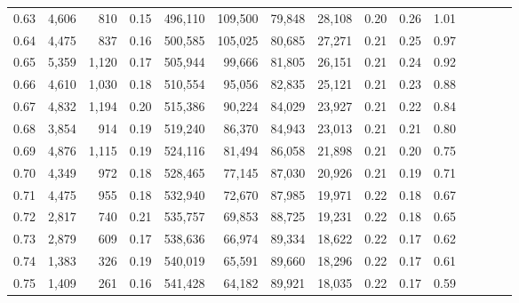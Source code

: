 \begin{tabular}{rrrcrrrrrrrrrrr}
0.63 &   4,606 &     810 &                                       0.15 &  496,110 &  109,500 &   79,848 &  28,108 &  0.20 &  0.26 &                         1.01 \\
0.64 &   4,475 &     837 &                                       0.16 &  500,585 &  105,025 &   80,685 &  27,271 &  0.21 &  0.25 &                         0.97 \\
0.65 &   5,359 &   1,120 &                                       0.17 &  505,944 &   99,666 &   81,805 &  26,151 &  0.21 &  0.24 &                         0.92 \\
0.66 &   4,610 &   1,030 &                                       0.18 &  510,554 &   95,056 &   82,835 &  25,121 &  0.21 &  0.23 &                         0.88 \\
0.67 &   4,832 &   1,194 &                                       0.20 &  515,386 &   90,224 &   84,029 &  23,927 &  0.21 &  0.22 &                         0.84 \\
0.68 &   3,854 &     914 &                                       0.19 &  519,240 &   86,370 &   84,943 &  23,013 &  0.21 &  0.21 &                         0.80 \\
0.69 &   4,876 &   1,115 &                                       0.19 &  524,116 &   81,494 &   86,058 &  21,898 &  0.21 &  0.20 &                         0.75 \\
0.70 &   4,349 &     972 &                                       0.18 &  528,465 &   77,145 &   87,030 &  20,926 &  0.21 &  0.19 &                         0.71 \\
0.71 &   4,475 &     955 &                                       0.18 &  532,940 &   72,670 &   87,985 &  19,971 &  0.22 &  0.18 &                         0.67 \\
0.72 &   2,817 &     740 &                                       0.21 &  535,757 &   69,853 &   88,725 &  19,231 &  0.22 &  0.18 &                         0.65 \\
0.73 &   2,879 &     609 &                                       0.17 &  538,636 &   66,974 &   89,334 &  18,622 &  0.22 &  0.17 &                         0.62 \\
0.74 &   1,383 &     326 &                                       0.19 &  540,019 &   65,591 &   89,660 &  18,296 &  0.22 &  0.17 &                         0.61 \\
0.75 &   1,409 &     261 &                                       0.16 &  541,428 &   64,182 &   89,921 &  18,035 &  0.22 &  0.17 &                         0.59 \\

\end{tabular}

